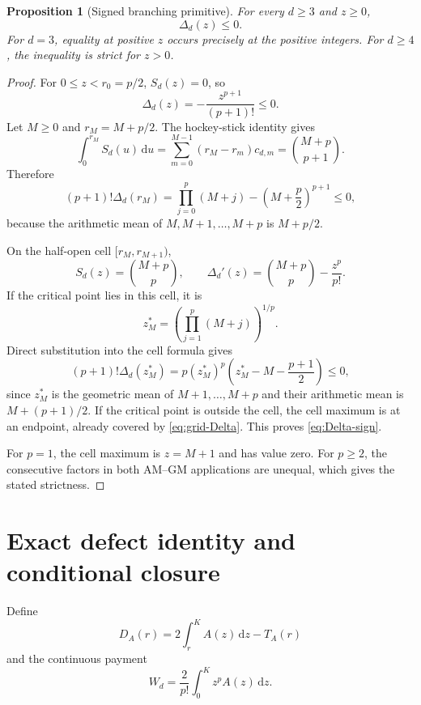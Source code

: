 \documentclass[11pt]{article}
\newtheorem{proposition}[theorem]{Proposition}
\theoremstyle{remark}
\newcommand{\dd}{\,\mathrm d}
\begin{document}
\begin{proposition}[Signed branching primitive]
\label{prop:primitive-sign}
For every $d\geq3$ and $z\geq0$,
\begin{equation}
 \boxed{\Delta_d(z)\leq0.}
 \label{eq:Delta-sign}
\end{equation}
For $d=3$, equality at positive $z$ occurs precisely at the positive
integers.  For $d\geq4$, the inequality is strict for $z>0$.
\end{proposition}

\begin{proof}
For $0\leq z<r_0=p/2$, $S_d(z)=0$, so
\[
 \Delta_d(z)=-\frac{z^{p+1}}{(p+1)!}\leq0.
\]
Let $M\geq0$ and $r_M=M+p/2$.  The hockey-stick identity gives
\[
 \int_0^{r_M}S_d(u)\dd u
 =\sum_{m=0}^{M-1}(r_M-r_m)c_{d,m}
 =\binom{M+p}{p+1}.
\]
Therefore
\begin{equation}
 (p+1)!\Delta_d(r_M)
 =\prod_{j=0}^{p}(M+j)
 -\left(M+\frac p2\right)^{p+1}\leq0,
 \label{eq:grid-Delta}
\end{equation}
because the arithmetic mean of $M,M+1,\ldots,M+p$ is $M+p/2$.

On the half-open cell $[r_M,r_{M+1})$,
\[
 S_d(z)=\binom{M+p}{p},
 \qquad
 \Delta_d'(z)=\binom{M+p}{p}-\frac{z^p}{p!}.
\]
If the critical point lies in this cell, it is
\[
 z_M^*=\left(\prod_{j=1}^{p}(M+j)\right)^{1/p}.
\]
Direct substitution into the cell formula gives
\begin{equation}
 (p+1)!\Delta_d(z_M^*)
 =p(z_M^*)^p
 \left(z_M^*-M-\frac{p+1}{2}\right)\leq0,
 \label{eq:critical-Delta}
\end{equation}
since $z_M^*$ is the geometric mean of $M+1,\ldots,M+p$ and their
arithmetic mean is $M+(p+1)/2$.  If the critical point is outside the
cell, the cell maximum is at an endpoint, already covered by
\eqref{eq:grid-Delta}.  This proves \eqref{eq:Delta-sign}.

For $p=1$, the cell maximum is $z=M+1$ and has value zero.  For $p\geq2$,
the consecutive factors in both AM--GM applications are unequal, which
gives the stated strictness.
\end{proof}

\section{Exact defect identity and conditional closure}
\label{sec:defect}

Define
\begin{equation}
 D_A(r)=2\int_r^K A(z)\dd z-T_A(r)
 \label{eq:tail-defect}
\end{equation}
and the continuous payment
\begin{equation}
 W_d=\frac2{p!}\int_0^K z^pA(z)\dd z.
 \label{eq:W-def}
\end{equation}
\end{document}
